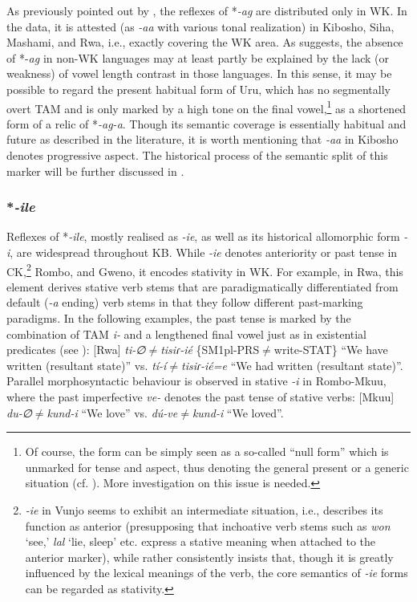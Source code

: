 \documentclass[output=paper]{langscibook}
\begin{document}
  As previously pointed out by \citet{PhilippsonMontlahuc2003}, the reflexes of *\textit{{}-ag} are distributed only in WK. In the data, it is attested (as \textit{{}-aa} with various tonal realization) in Kibosho, Siha, Mashami, and Rwa, i.e., exactly covering the WK area. As \citet{Shinagawa2015} suggests, the absence of *-\textit{ag} in non-WK languages may at least partly be explained by the lack (or weakness) of vowel length contrast in those languages. In this sense, it may be possible to regard the present habitual form of Uru, which has no segmentally overt TAM and is only marked by a high tone on the final vowel,\footnote{Of course, the form can be simply seen as a so-called “null form” which is unmarked for tense and aspect, thus denoting the general present or a generic situation (cf. \citealt[117--118]{Nurse2008}). More investigation on this issue is needed.} as a shortened form of a relic of *\textit{{}-ag-a}. Though its semantic coverage is essentially habitual and future as described in the literature, it is worth mentioning that \textit{{}-aa} in Kibosho denotes progressive aspect. The historical process of the semantic split of this marker will be further discussed in .

\subsubsection{*\textit{{}-ile}}\label{sec:shinagawa:3.3.2}

  Reflexes of *\textit{{}-ile}, mostly realised as \textit{{}-ie}, as well as its historical allomorphic form \textit{{}-i}, are widespread throughout KB. While \textit{{}-ie} denotes anteriority or past tense in CK,\footnote{\textit{{}-ie} in Vunjo seems to exhibit an intermediate situation, i.e., \citet{Nurse2003a} describes its function as anterior (presupposing that inchoative verb stems such as \textit{won} ‘see,’ \textit{lal} ‘lie, sleep’ etc. express a stative meaning when attached to the anterior marker), while \citet{Moshi1994} rather consistently insists that, though it is greatly influenced by the lexical meanings of the verb, the core semantics of \textit{{}-ie} forms can be regarded as stativity.} Rombo, and Gweno, it encodes stativity in WK. For example, in Rwa, this element derives stative verb stems that are paradigmatically differentiated from default (\textit{{}-a} ending) verb stems in that they follow different past-marking paradigms. In the following examples, the past tense is marked by the combination of TAM \textit{i-} and a lengthened final vowel just as in existential predicates (see ): [Rwa] \textit{ti-∅${\neq}$tisiɾ-ié} \{SM1pl-PRS${\neq}$write-STAT\} “We have written (resultant state)” vs. \textit{tí-í${\neq}$tisiɾ-ié=e} “We had written (resultant state)”. Parallel morphosyntactic behaviour is observed in stative \textit{{}-i} in Rombo-Mkuu, where the past imperfective \textit{ve-} denotes the past tense of stative verbs: [Mkuu] \textit{du-∅${\neq}$kund-i} “We love” vs. \textit{dú-ve${\neq}$kund-i} “We loved”.
\end{document}

